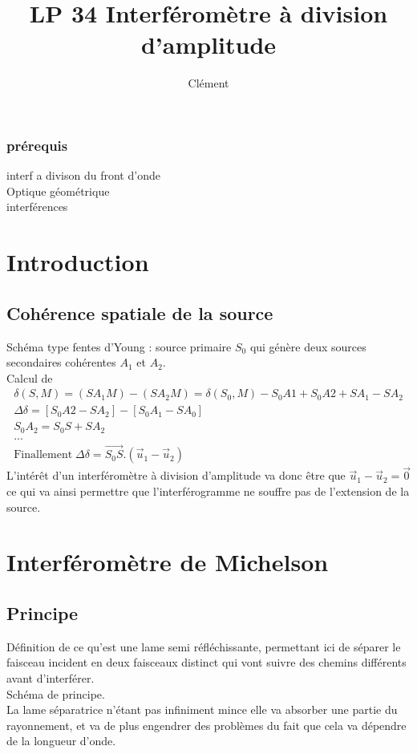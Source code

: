 \documentclass[12pt,prb,aps,epsf]{report}
\begin{document}
	
	\title{LP 34 Interféromètre à division d'amplitude}
	\author{Clément}
	
	\maketitle
	
	\tableofcontents
	
	\pagebreak
	
	
\subsubsection{prérequis}
interf a divison du front d'onde\\
Optique géométrique\\
interférences

\section{Introduction}
\subsection{Cohérence spatiale de la source}
Schéma type fentes d'Young : source primaire $S_0$ qui génère deux sources secondaires cohérentes $A_1$ et $A_2$.\\
Calcul de 
\begin{eqnarray}
\delta (S,M) = (SA_1M)-(SA_2M) = \delta (S_0,M) -S_0A1 + S_0A2 + SA_1 - SA_2\\
\Delta \delta = [S_0A2-SA_2] - [S_0A_1-SA_0]\\
S_0A_2 = S_0S + SA_2\\
... \\
\mathrm{Finallement}\; \Delta \delta = \vec{S_0S}.(\vec{u}_1-\vec{u}_2)
\end{eqnarray}
L'intérêt d'un interféromètre à division d'amplitude va donc être que $\vec{u}_1-\vec{u}_2=\vec{0}$ ce qui va ainsi permettre que l'interférogramme ne souffre pas de l'extension de la source.

\section{Interféromètre de Michelson}
\subsection{Principe}
Définition de ce qu'est une lame semi réfléchissante, permettant ici de séparer le faisceau incident en deux faisceaux distinct qui vont suivre des chemins différents avant d'interférer.\\
Schéma de principe.\\
La lame séparatrice n'étant pas infiniment mince elle va absorber une partie du rayonnement, et va de plus engendrer des problèmes du fait que cela va dépendre de la longueur d'onde.\\
\end{document}

